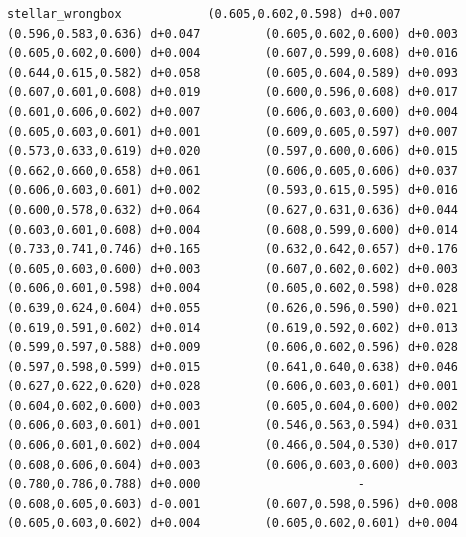 \documentclass[11pt, letterpaper, openany]{book}
\begin{document}
\begin{empiricalbox}
\begin{lstlisting}[style=terminal]
stellar_wrongbox            (0.605,0.602,0.598) d+0.007         (0.596,0.583,0.636) d+0.047         (0.605,0.602,0.600) d+0.003         (0.605,0.602,0.600) d+0.004         (0.607,0.599,0.608) d+0.016         (0.644,0.615,0.582) d+0.058         (0.605,0.604,0.589) d+0.093         (0.607,0.601,0.608) d+0.019         (0.600,0.596,0.608) d+0.017         (0.601,0.606,0.602) d+0.007         (0.606,0.603,0.600) d+0.004         (0.605,0.603,0.601) d+0.001         (0.609,0.605,0.597) d+0.007         (0.573,0.633,0.619) d+0.020         (0.597,0.600,0.606) d+0.015         (0.662,0.660,0.658) d+0.061         (0.606,0.605,0.606) d+0.037         (0.606,0.603,0.601) d+0.002         (0.593,0.615,0.595) d+0.016         (0.600,0.578,0.632) d+0.064         (0.627,0.631,0.636) d+0.044         (0.603,0.601,0.608) d+0.004         (0.608,0.599,0.600) d+0.014         (0.733,0.741,0.746) d+0.165         (0.632,0.642,0.657) d+0.176         (0.605,0.603,0.600) d+0.003         (0.607,0.602,0.602) d+0.003         (0.606,0.601,0.598) d+0.004         (0.605,0.602,0.598) d+0.028         (0.639,0.624,0.604) d+0.055         (0.626,0.596,0.590) d+0.021         (0.619,0.591,0.602) d+0.014         (0.619,0.592,0.602) d+0.013         (0.599,0.597,0.588) d+0.009         (0.606,0.602,0.596) d+0.028         (0.597,0.598,0.599) d+0.015         (0.641,0.640,0.638) d+0.046         (0.627,0.622,0.620) d+0.028         (0.606,0.603,0.601) d+0.001         (0.604,0.602,0.600) d+0.003         (0.605,0.604,0.600) d+0.002         (0.606,0.603,0.601) d+0.001         (0.546,0.563,0.594) d+0.031         (0.606,0.601,0.602) d+0.004         (0.466,0.504,0.530) d+0.017         (0.608,0.606,0.604) d+0.003         (0.606,0.603,0.600) d+0.003         (0.780,0.786,0.788) d+0.000                      -                      (0.608,0.605,0.603) d-0.001         (0.607,0.598,0.596) d+0.008         (0.605,0.603,0.602) d+0.004         (0.605,0.602,0.601) d+0.004     

\end{lstlisting}
\end{empiricalbox}
\end{document}
